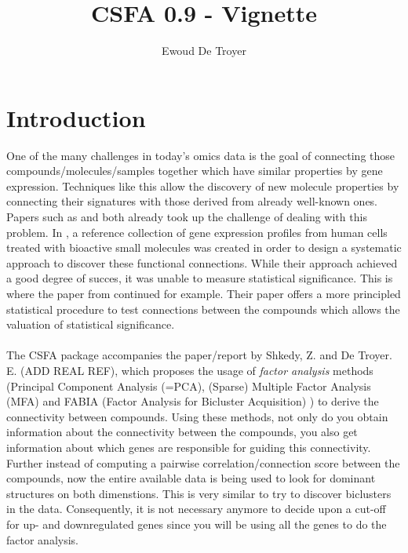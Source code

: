 \documentclass[a4paper]{article}\usepackage[]{graphicx}\usepackage[]{color}
\title{CSFA 0.9 - Vignette}
\date{}
\author{Ewoud De Troyer}
\begin{document}
\maketitle
\section{Introduction}

One of the many challenges in today's omics data is the goal of connecting those
compounds/molecules/samples together which have similar properties by gene
expression.
Techniques like this allow the discovery of new molecule properties by
connecting their signatures with those derived from already well-known ones.\\
Papers such as \citet{Lamb2006} and \citet{Zhang2008} both already took up the
challenge of dealing with this problem. In \citet{Lamb2006}, a reference
collection of gene expression profiles from human cells treated with bioactive
small molecules was created in order to design a systematic approach to discover
these functional connections. While their approach achieved a good degree of
succes, it was unable to measure statistical significance. This is where the
paper from \citet{Zhang2008} continued for example. Their paper offers a more
principled statistical procedure to test connections between the compounds which allows the valuation of statistical significance.
\\ \\
The CSFA package accompanies the paper/report by Shkedy, Z. and De Troyer. E. (ADD REAL REF),
which proposes the usage of {\it factor analysis} methods (Principal Component
Analysis (=PCA), (Sparse) Multiple Factor Analysis (MFA) \citep{Abdi2013} and
FABIA (Factor Analysis for Bicluster Acquisition) \citep{Hochreiter2010}) to
derive the connectivity between compounds.
Using these methods, not only do you obtain information about the connectivity between the compounds, you also get
information about which genes are responsible for guiding this connectivity.\\
Further instead of computing a pairwise correlation/connection score between the
compounds, now the entire available data is being used to look for dominant structures on both dimenstions. This is very similar to try to discover biclusters in the data. Consequently, it is not necessary anymore to decide upon a cut-off for up- and downregulated genes since you will be using all the genes to do the factor analysis.
\end{document}
